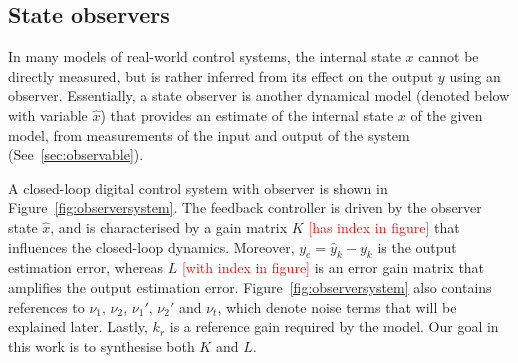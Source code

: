 \documentclass[sigconf]{llncs}
\newcommand{\mat}[1]{{#1}}
\renewcommand{\vec}[1]{{#1}}
\renewcommand{\note}[1]{\textcolor{red}{[#1]}}
\begin{document}
\subsection{State observers}\label{sec:observer}

In many models of real-world control systems, 
the internal state $x$ cannot be directly measured,  
but is rather inferred from its effect on the output $\vec{y}$ using an observer.  
Essentially, a state observer is another dynamical model (denoted below with variable $\hat{\vec{x}}$) 
that provides an estimate of the internal state $x$ of the given model, 
from measurements of the input and output of the system (See~\ref{sec:observable}). 

A closed-loop digital control system with observer is shown in Figure~\ref{fig:observersystem}. 
The feedback controller is driven by the observer state $\hat{\vec{x}}$, 
and is characterised by a gain matrix $\mat{K}$ \note{has index in figure} that influences the closed-loop dynamics.  
Moreover, $\vec{y}_e=\hat{\vec{y}}_k - \vec{y}_k$ is the output estimation error,  
  whereas $\mat{L}$ \note{with index in figure} is an error gain matrix that amplifies the output estimation error. 
Figure~\ref{fig:observersystem} also contains references to $\nu_1$, $\nu_2$, $\nu_1'$, $\nu_2'$ and $\nu_t$, which
  denote noise terms that will be explained later.   
  Lastly, $k_r$ is a reference gain required by the model.  
  Our goal in this work is to synthesise both $\mat{K}$ and $\mat{L}$.
 
\end{document}

